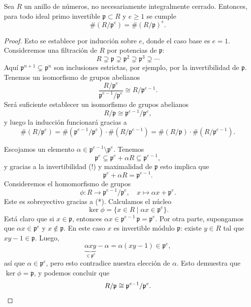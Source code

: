 \begin{lema}
  Sea $R$ un anillo de números, no necesariamente integralmente cerrado.
  Entonces, para todo ideal primo invertible $\mathfrak{p} \subset R$ y
  $e \ge 1$ se cumple
  $$\# (R/\mathfrak{p}^e) = \# (R/\mathfrak{p})^e.$$

  \begin{proof}
    Esto se establece por inducción sobre $e$, donde el caso base es $e = 1$.
    Consideremos una filtración de $R$ por potencias de $\mathfrak{p}$:
    \[ R \supsetneq \mathfrak{p} \supsetneq \mathfrak{p}^2 \supsetneq
       \mathfrak{p}^3 \supsetneq \cdots \]
    Aquí $\mathfrak{p}^{n+1} \subsetneq \mathfrak{p}^n$ son inclusiones
    estrictas, por ejemplo, por la invertibilidad de $\mathfrak{p}$.
    Tenemos un isomorfismo de grupos abelianos
    \[ \frac{R/\mathfrak{p}^e}{\mathfrak{p}^{e-1}/\mathfrak{p}^e} \cong
       R/\mathfrak{p}^{e-1}. \]
    Será suficiente establecer un isomorfismo de grupos abelianos
    $$R/\mathfrak{p} \cong \mathfrak{p}^{e-1}/\mathfrak{p}^e,$$
    y luego la inducción funcionará gracias a
    \[ \# (R/\mathfrak{p}^e) =
       \# (\mathfrak{p}^{e-1}/\mathfrak{p}^e) \cdot \# (R/\mathfrak{p}^{e-1}) =
       \# (R/\mathfrak{p})\cdot \# (R/\mathfrak{p}^{e-1}). \]

    Escojamos un elemento
    $\alpha \in \mathfrak{p}^{e-1}\setminus\mathfrak{p}^e$.  Tenemos
    $$\mathfrak{p}^e \subsetneq \mathfrak{p}^e + \alpha R \subseteq \mathfrak{p}^{e-1},$$
    y gracias a la invertibilidad (!) y maximalidad de $\mathfrak{p}$
    esto implica que
    \[ \tag{*} \mathfrak{p}^e + \alpha R = \mathfrak{p}^{e-1}. \]
    Consideremos el homomorfismo de grupos
    \[ \phi\colon R \to \mathfrak{p}^{e-1}/\mathfrak{p}^e, \quad
       x \mapsto \alpha x + \mathfrak{p}^e. \]
    Este es sobreyectivo gracias a (*). Calculamos el núcleo
    $$\ker \phi = \{ x \in R \mid \alpha x \in \mathfrak{p}^e \}.$$
    Está claro que si $x \in \mathfrak{p}$, entonces
    $\alpha x \in \mathfrak{p}^{e-1} \, \mathfrak{p} = \mathfrak{p}^e$.
    Por otra parte, supongamos que $\alpha x \in \mathfrak{p}^e$ y
    $x \notin \mathfrak{p}$. En este caso $x$ es invertible módulo
    $\mathfrak{p}$: existe $y \in R$ tal que $xy - 1 \in \mathfrak{p}$. Luego,
    \[ \underbrace{\alpha x y}_{\in \mathfrak{p}^e} - \alpha =
       \alpha (xy - 1) \in \mathfrak{p}^e, \]
    así que $\alpha \in \mathfrak{p}^e$, pero esto contradice nuestra elección
    de $\alpha$. Esto demuestra que $\ker \phi = \mathfrak{p}$, y podemos
    concluir que
    \[ R/\mathfrak{p} \cong \mathfrak{p}^{e-1}/\mathfrak{p}^e. \qedhere \]
  \end{proof}
\end{lema}

